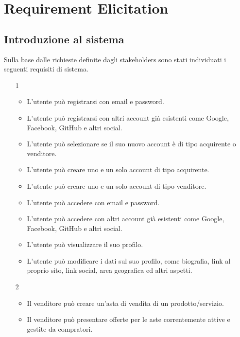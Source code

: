 
\chapter{Requirement Elicitation}
     \section{Introduzione al sistema} %
        Sulla base dalle richieste definite dagli stakeholders sono stati individuati i seguenti requisiti di sistema.
        
        \begin{itemize}
            \item[1]
            \begin{itemize} %
                \item L'utente può registrarsi con email e password.
                \item L'utente può registrarsi con altri account già esistenti come Google, Facebook, GitHub e altri social.
                \item L'utente può selezionare se il suo nuovo account è di tipo acquirente o venditore.
                \item L'utente può creare uno e un solo account di tipo acquirente.
                \item L'utente può creare uno e un solo account di tipo venditore.
                \item L'utente può accedere con email e password.
                \item L'utente può accedere con altri account già esistenti come Google, Facebook, GitHub e altri social.
                \item L'utente può visualizzare il suo profilo.
                \item L'utente può modificare i dati sul suo profilo, come biografia, link al proprio sito, link social, area geografica ed altri aspetti.
            \end{itemize} %
            \item[2] 
            \begin{itemize} %
                \item Il venditore può creare un'asta di vendita di un prodotto/servizio.
                \item Il venditore può presentare offerte per le aste correntemente attive e gestite da compratori.

\end{itemize}
\end{itemize}
